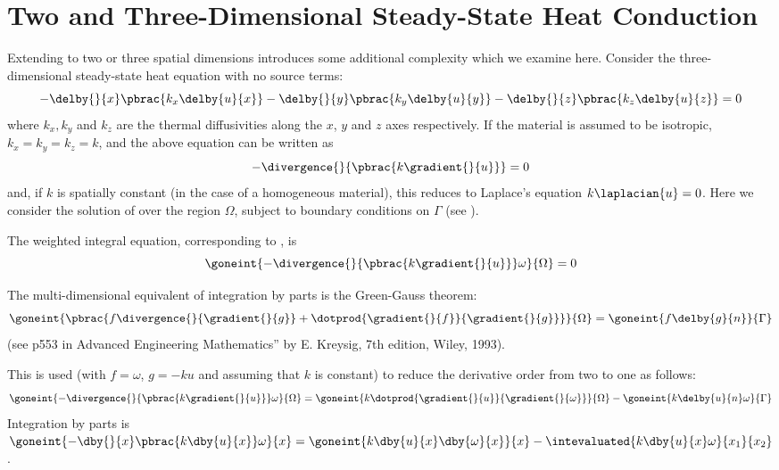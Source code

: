 \section{Two and Three-Dimensional Steady-State Heat Conduction}
\label{sec:2and3-DSSHC}
Extending  to two or three spatial dimensions 
introduces some additional complexity which we examine here. Consider the
three-dimensional steady-state heat equation with no source terms:
\begin{equation*}
  -\delby{ }{x}\pbrac{k_{x}\delby{u}{x}} -\delby{ }{y}\pbrac{k_{y}\delby{u}{y}}
  -\delby{ }{z}\pbrac{k_{z}\delby{u}{z}}=0
\end{equation*}       
where $k_{x},k_{y}$ and $k_{z}$ are the thermal diffusivities along the $x$, $y$
and $z$ axes respectively. If the material is assumed to be isotropic, $k_{x}
= k_{y} = k_{z} = k$, and the above equation can be written
as
\begin{equation}
  -\divergence{}{\pbrac{k \gradient{}{u}}} = 0
  \label{eqn:S-SH}
\end{equation}
and, if $k$ is spatially constant (in the case of a homogeneous material), this reduces to Laplace's equation 
$k\laplacian{u}=0$. Here we consider the solution of  over the 
region $\Omega$, subject to boundary conditions on $\Gamma$ (see ).

The weighted integral equation, corresponding to , is
\begin{equation}
  \goneint{-\divergence{}{\pbrac{k\gradient{}{u}}}\omega}{\Omega} = 0
  \label{eqn:weighted_integral}
\end{equation}

The multi-dimensional equivalent of integration by parts is the Green-Gauss
theorem:
\begin{equation}
  \goneint{\pbrac{f\divergence{}{\gradient{}{g}}+\dotprod{\gradient{}{f}}{\gradient{}{g}}}}{\Omega} =
  \goneint{f \delby{g}{n}}{\Gamma}
  \label{eqn:nabla_eq}
\end{equation}
(see p553 in Advanced Engineering Mathematics'' by E. Kreysig, 7th edition,
Wiley, 1993).

This is used (with $f=\omega$, $g=-ku$ and assuming that $k$ is constant) 
to reduce the derivative order from two to one as follows:
\begin{equation}
  \goneint{-\divergence{}{\pbrac{k\gradient{}{u}}}\omega}{\Omega} 
  = \goneint{k \dotprod{\gradient{}{u}}{\gradient{}{\omega}}}{\Omega} 
  - \goneint{k\delby{u}{n} \omega}{\Gamma}      
  \label{eqn:Green-Gauss}
\end{equation}
\cf Integration by parts is $\goneint{-\dby{ }{x}\pbrac{k\dby{u}{x}}\omega}{x} =
\goneint{k \dby{u}{x} \dby{\omega}{x}}{x} - \intevaluated{k\dby{u}{x}\omega}{x_{1}}{x_{2}}$.

